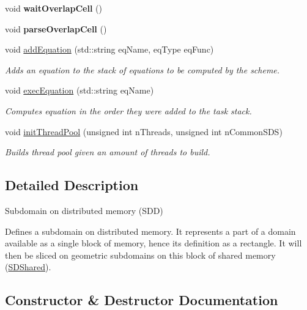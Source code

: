 \begin{DoxyCompactItemize}
\mbox{\label{classSDDistributed_a97f1d4d864845aab5cf910eccf2e0e62}} 
void {\bfseries wait\+Overlap\+Cell} ()
\item 
\mbox{\label{classSDDistributed_aac3708e2ca754bdb3ea192cae5341d84}} 
void {\bfseries parse\+Overlap\+Cell} ()
\item 
void \mbox{\hyperlink{classSDDistributed_a0974e2cce9bfcddfd0acccd1105d980f}{add\+Equation}} (std\+::string eq\+Name, eq\+Type eq\+Func)
\begin{DoxyCompactList}\small\item\em Adds an equation to the stack of equations to be computed by the scheme. \end{DoxyCompactList}\item 
\mbox{\label{classSDDistributed_a00a539076c306457a4dd1aef2c4f2039}} 
void \mbox{\hyperlink{classSDDistributed_a00a539076c306457a4dd1aef2c4f2039}{exec\+Equation}} (std\+::string eq\+Name)
\begin{DoxyCompactList}\small\item\em Computes equation in the order they were added to the task stack. \end{DoxyCompactList}\item 
void \mbox{\hyperlink{classSDDistributed_a64669d8f5e7b0d660fbe3b5407d46d46}{init\+Thread\+Pool}} (unsigned int n\+Threads, unsigned int n\+Common\+S\+DS)
\begin{DoxyCompactList}\small\item\em Builds thread pool given an amount of threads to build. \end{DoxyCompactList}\end{DoxyCompactItemize}


\subsection{Detailed Description}
Subdomain on distributed memory (S\+DD) 

Defines a subdomain on distributed memory. It represents a part of a domain available as a single block of memory, hence its definition as a rectangle. It will then be sliced on geometric subdomains on this block of shared memory (\mbox{\hyperlink{classSDShared}{S\+D\+Shared}}). 

\subsection{Constructor \& Destructor Documentation}
\mbox{\label{classSDDistributed_a07332d418da104a969360c6c671feef4}} 
